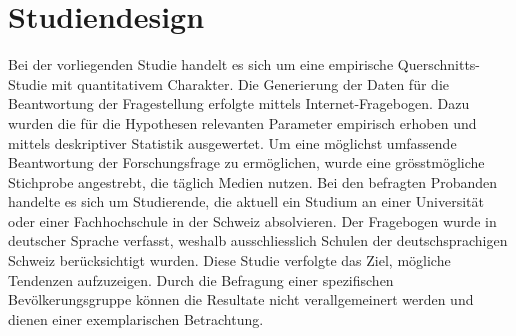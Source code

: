 %
%
\glsresetall
\let\raggedsection\centering
{}
\setcounter{chapter}{2}
\setcounter{section}{0}
\let\raggedsection\raggedright 
\section{Studiendesign}\label{section.studiendesign}
Bei der vorliegenden Studie handelt es sich um eine empirische Querschnitts-Studie mit quantitativem Charakter. Die Generierung der Daten für die Beantwortung der Fragestellung erfolgte mittels Internet-Fragebogen. Dazu wurden die für die Hypothesen relevanten Parameter empirisch erhoben und mittels deskriptiver Statistik ausgewertet. Um eine möglichst umfassende Beantwortung der Forschungsfrage zu ermöglichen, wurde eine grösstmögliche Stichprobe angestrebt, die täglich Medien nutzen. Bei den befragten Probanden handelte es sich um Studierende, die aktuell ein Studium an einer Universität oder einer Fachhochschule in der Schweiz absolvieren. Der Fragebogen wurde in deutscher Sprache verfasst, weshalb ausschliesslich Schulen der deutschsprachigen Schweiz berücksichtigt wurden. Diese Studie verfolgte das Ziel, mögliche Tendenzen aufzuzeigen. Durch die Befragung einer spezifischen Bevölkerungsgruppe können die Resultate nicht verallgemeinert werden und dienen einer exemplarischen Betrachtung.

